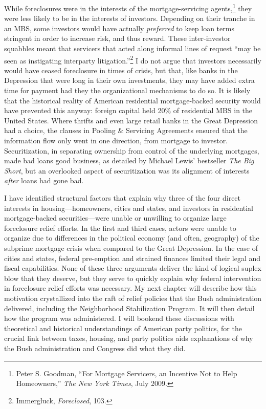 \documentclass[12pt,oneside]{psthesis}
\begin{document}
While foreclosures were in the interests of the mortgage-servicing agents,\footnote{Peter S. Goodman, ``For Mortgage Servicers, an Incentive Not to Help Homeowners,'' \emph{The New York Times}, July 2009.} they were less likely to be in the interests of investors.
Depending on their tranche in an MBS, some investors would have actually \emph{preferred} to keep loan terms stringent in order to increase risk, and thus reward.
These inter-investor squabbles meant that servicers that acted along informal lines of request ``may be seen as instigating interparty litigation.''\footnote{Immergluck, \emph{Foreclosed}, 103.}
I do not argue that investors necessarily would have ceased foreclosure in times of crisis, but that, like banks in the Depression that were long in their own investments, they may have added extra time for payment had they the organizational mechanisms to do so.
It is likely that the historical reality of American residential mortgage-backed security would have prevented this anyway: foreign capital held 20\% of residential MBS in the United States.
Where thrifts and even large retail banks in the Great Depression had a choice, the clauses in Pooling \& Servicing Agreements ensured that the information flow only went in one direction, from mortgage to investor.
Securitization, in separating ownership from control of the underlying mortgages, made bad loans good business, as detailed by Michael Lewis' bestseller \emph{The Big Short}, but an overlooked aspect of securitization was its alignment of interests \emph{after} loans had gone bad.

I have identified structural factors that explain why three of the four direct interests in housing---homeowners, cities and states, and investors in residential mortgage-backed securities---were unable or unwilling to organize large foreclosure relief efforts.
In the first and third cases, actors were unable to organize due to differences in the political economy (and often, geography) of the subprime mortgage crisis when compared to the Great Depression.
In the case of cities and states, federal pre-emption and strained finances limited their legal and fiscal capabilities.
None of these three arguments deliver the kind of logical suplex blow that they deserve, but they serve to quickly explain why federal intervention in foreclosure relief efforts was necessary.
My next chapter will describe how this motivation crystallized into the raft of relief policies that the Bush administration delivered, including the Neighborhood Stabilization Program.
It will then detail how the program was administered.
I will bookend these discussions with theoretical and historical understandings of American party politics, for the crucial link between taxes, housing, and party politics aids explanations of why the Bush administration and Congress did what they did.
\end{document}
